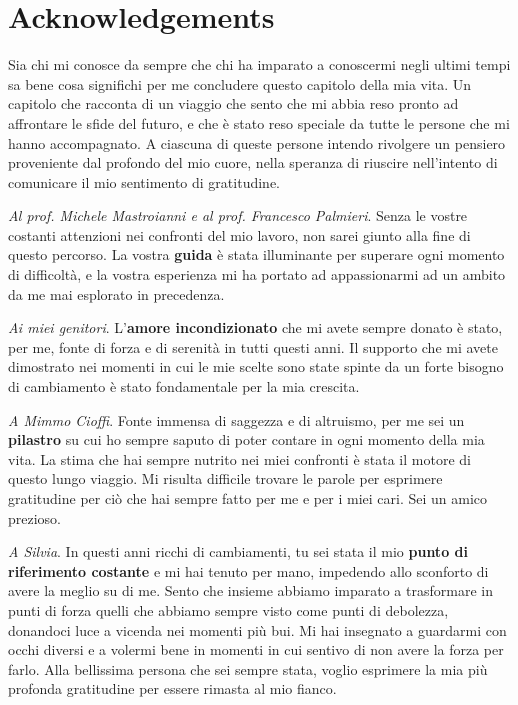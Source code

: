 \chapter{Acknowledgements}
Sia chi mi conosce da sempre che chi ha imparato a conoscermi negli ultimi tempi sa bene cosa significhi per me concludere questo capitolo della mia vita. Un capitolo che racconta di un viaggio che sento che mi abbia reso pronto ad affrontare le sfide del futuro, e che è stato reso speciale da tutte le persone che mi hanno accompagnato. A ciascuna di queste persone intendo rivolgere un pensiero proveniente dal profondo del mio cuore, nella speranza di riuscire nell'intento di comunicare il mio sentimento di gratitudine. 

\emph{Al prof. Michele Mastroianni e al prof. Francesco Palmieri}. Senza le vostre costanti attenzioni nei confronti del mio lavoro, non sarei giunto alla fine di questo percorso. La vostra \textbf{guida} è stata illuminante per superare ogni momento di difficoltà, e la vostra esperienza mi ha portato ad appassionarmi ad un ambito da me mai esplorato in precedenza.

\emph{Ai miei genitori}. L'\textbf{amore incondizionato} che mi avete sempre donato è stato, per me, fonte di forza e di serenità in tutti questi anni. Il supporto che mi avete dimostrato nei momenti in cui le mie scelte sono state spinte da un forte bisogno di cambiamento è stato fondamentale per la mia crescita. 

\emph{A Mimmo Cioffi}. Fonte immensa di saggezza e di altruismo, per me sei un \textbf{pilastro} su cui ho sempre saputo di poter contare in ogni momento della mia vita. La stima che hai sempre nutrito nei miei confronti è stata il motore di questo lungo viaggio. Mi risulta difficile trovare le parole per esprimere gratitudine per ciò che hai sempre fatto per me e per i miei cari. Sei un amico prezioso.

\emph{A Silvia}. In questi anni ricchi di cambiamenti, tu sei stata il mio \textbf{punto di riferimento costante} e mi hai tenuto per mano, impedendo allo sconforto di avere la meglio su di me. Sento che insieme abbiamo imparato a trasformare in punti di forza quelli che abbiamo sempre visto come punti di debolezza, donandoci luce a vicenda nei momenti più bui. Mi hai insegnato a guardarmi con occhi diversi e a volermi bene in momenti in cui sentivo di non avere la forza per farlo. Alla bellissima persona che sei sempre stata, voglio esprimere la mia più profonda gratitudine per essere rimasta al mio fianco.
\newpage 

